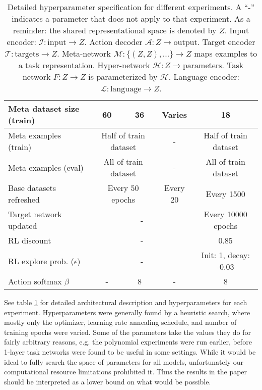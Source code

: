 \begin{table}
\begin{tabular}{|p{3cm}||c|c|c|c|}
Meta dataset size (train) & 60 & 36 & Varies & 18 \\\hline
Meta examples (train) & \multicolumn{2}{c|}{Half of train dataset} & - & Half of train dataset \\\hline
Meta examples (eval) & \multicolumn{2}{c|}{All of train dataset} & - & All of train dataset \\\hline
Base datasets refreshed & \multicolumn{2}{c|}{Every 50 epochs} & Every 20 & Every 1500  \\\hline
Target network updated & \multicolumn{3}{c|}{-} & Every 10000 epochs  \\\hline
RL discount & \multicolumn{3}{c|}{-} & 0.85 \\\hline
RL explore prob. (\(\epsilon\)) & \multicolumn{3}{c|}{-} & \multicolumn{1}{p{2.5cm}|}{Init: 1, decay: -0.03}\\\hline
Action softmax \(\beta\) & - & 8 & - & 8\\\hline
\end{tabular}
\caption[Detailed hyperparameter specification.]{Detailed hyperparameter specification for different experiments. A ``-'' indicates a parameter that does not apply to that experiment. As a reminder: the shared representational space is denoted by $Z$. Input encoder: $\mathcal{I}: \text{input} \rightarrow Z$. Action decoder $\mathcal{A}: Z \rightarrow \text{output}$. Target encoder $\mathcal{T}: \text{targets} \rightarrow Z$. Meta-network $\mathcal{M}: \{(Z, Z), ...\} \rightarrow Z $ maps examples to a task representation. Hyper-network $\mathcal{H}: Z \rightarrow \text{parameters}$. Task network $F: Z \rightarrow Z$ is parameterized by $\mathcal{H}$. Language encoder: $\mathcal{L}: \text{language} \rightarrow Z$. } \label{supp_hyperparameter_table}
\end{table}
See table \ref{supp_hyperparameter_table} for detailed architectural description and hyperparameters for each experiment. Hyperparameters were generally found by a heuristic search, where mostly only the optimizer, learning rate annealing schedule, and number of training epochs were varied. Some of the parameters take the values they do for fairly arbitrary reasons, e.g. the polynomial experiments were run earlier, before 1-layer task networks were found to be useful in some settings. While it would be ideal to fully search the space of parameters for all models, unfortunately our computational resource limitations prohibited it. Thus the results in the paper should be interpreted as a lower bound on what would be possible. \par
